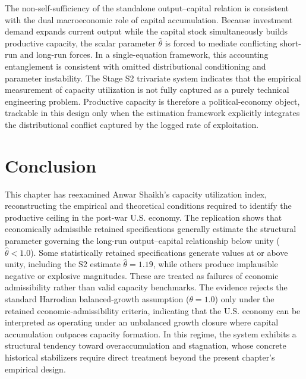 \documentclass[11pt]{article}
\begin{document}
The non-self-sufficiency of the standalone output--capital relation is consistent with the dual macroeconomic role of capital accumulation. Because investment demand expands current output while the capital stock simultaneously builds productive capacity, the scalar parameter $\hat{\theta}$ is forced to mediate conflicting short-run and long-run forces. In a single-equation framework, this accounting entanglement is consistent with omitted distributional conditioning and parameter instability. The Stage S2 trivariate system indicates that the empirical measurement of capacity utilization is not fully captured as a purely technical engineering problem. Productive capacity is therefore a political-economy object, trackable in this design only when the estimation framework explicitly integrates the distributional conflict captured by the logged rate of exploitation.

\section{Conclusion}
\label{sec:conclusion}

This chapter has reexamined Anwar Shaikh's capacity utilization index, reconstructing the empirical and theoretical conditions required to identify the productive ceiling in the post-war U.S. economy. The replication shows that economically admissible retained specifications generally estimate the structural parameter governing the long-run output--capital relationship below unity ($\hat{\theta} < 1.0$). Some statistically retained specifications generate values at or above unity, including the S2 estimate $\hat{\theta}=1.19$, while others produce implausible negative or explosive magnitudes. These are treated as failures of economic admissibility rather than valid capacity benchmarks. The evidence rejects the standard Harrodian balanced-growth assumption ($\theta = 1.0$) only under the retained economic-admissibility criteria, indicating that the U.S. economy can be interpreted as operating under an unbalanced growth closure where capital accumulation outpaces capacity formation. In this regime, the system exhibits a structural tendency toward overaccumulation and stagnation, whose concrete historical stabilizers require direct treatment beyond the present chapter's empirical design.
\end{document}
